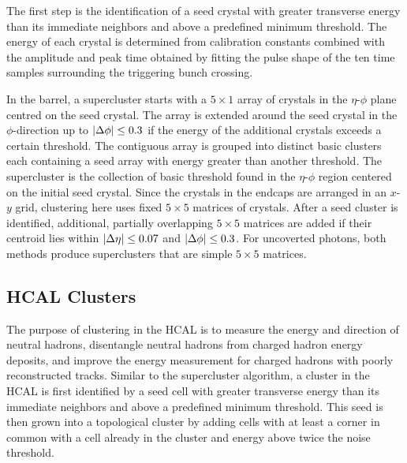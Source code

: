 
The first step is the identification of a seed crystal with greater transverse energy than its immediate neighbors and above a predefined minimum threshold.
The energy of each crystal is determined from calibration constants combined with the amplitude and peak time obtained by fitting the pulse shape of the ten time samples surrounding the triggering bunch crossing.


In the barrel, a supercluster starts with a $5\times1$ array of crystals in the $\eta$-$\phi$ plane centred on the seed crystal.
The array is extended around the seed crystal in the $\phi$-direction up to $\lvert \Delta\phi \rvert \le 0.3$ if the energy of the additional crystals exceeds a certain threshold. 
The contiguous array is grouped into distinct basic clusters each containing a seed array with energy greater than another threshold.
The supercluster is the collection of basic threshold found in the $\eta$-$\phi$ region centered on the initial seed crystal.
Since the crystals in the endcaps are arranged in an $x$-$y$ grid, clustering here uses fixed $5\times5$ matrices of crystals. 
After a seed cluster is identified, additional, partially overlapping $5\times5$ matrices are added if their centroid lies within $\lvert \Delta\eta \rvert \le 0.07$ and $\lvert \Delta\phi \rvert \le 0.3$.
For uncoverted photons, both methods produce superclusters that are simple $5\times5$ matrices.

\subsection{HCAL Clusters}
\label{sec:pf_clusters}


The purpose of clustering in the HCAL is to measure the energy and direction of neutral hadrons, disentangle neutral hadrons from charged hadron energy deposits, and improve the energy measurement for charged hadrons with poorly reconstructed tracks.
Similar to the supercluster algorithm, a cluster in the HCAL is first identified by a seed cell with greater transverse energy than its immediate neighbors and above a predefined minimum threshold.
This seed is then grown into a topological cluster by adding cells with at least a corner in common with a cell already in the cluster and energy above twice the noise threshold.

